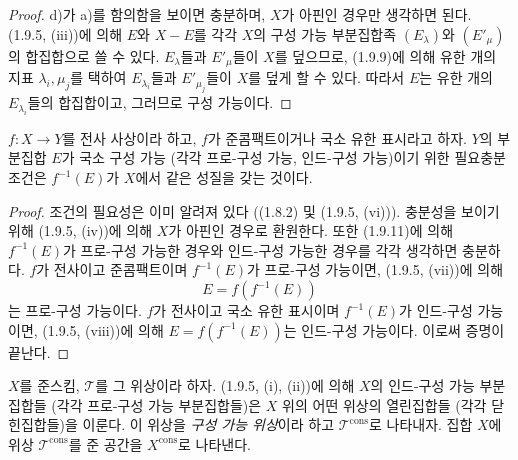 \begin{proof}
d)가 a)를 함의함을 보이면 충분하며, $X$가 아핀인 경우만 생각하면
된다. (1.9.5, (iii))에 의해 $E$와 $X-E$를 각각 $X$의 구성 가능
부분집합족 $(E_\lambda)$와 $(E'_\mu)$의 합집합으로 쓸 수 있다.
$E_\lambda$들과 $E'_\mu$들이 $X$를 덮으므로, (1.9.9)에 의해 유한
개의 지표 $\lambda_i,\mu_j$를 택하여 $E_{\lambda_i}$들과
$E'_{\mu_j}$들이 $X$를 덮게 할 수 있다. 따라서 $E$는 유한 개의
$E_{\lambda_i}$들의 합집합이고, 그러므로 구성 가능이다.
\end{proof}

\begin{corollary}[1.9.12]
\label{IV.1.9.12-fr}
$f:X\to Y$를 전사 사상이라 하고, $f$가 준콤팩트이거나 국소 유한
표시라고 하자. $Y$의 부분집합 $E$가 국소 구성 가능 (각각 프로-구성
가능, 인드-구성 가능)이기 위한 필요충분조건은 $f^{-1}(E)$가 $X$에서
같은 성질을 갖는 것이다.
\end{corollary}


\begin{proof}
조건의 필요성은 이미 알려져 있다 ((1.8.2) 및 (1.9.5, (vi))). 충분성을
보이기 위해 (1.9.5, (iv))에 의해 $X$가 아핀인 경우로 환원한다. 또한
(1.9.11)에 의해 $f^{-1}(E)$가 프로-구성 가능한 경우와 인드-구성 가능한
경우를 각각 생각하면 충분하다. $f$가 전사이고 준콤팩트이며
$f^{-1}(E)$가 프로-구성 가능이면, (1.9.5, (vii))에 의해
\[
  E=f(f^{-1}(E))
\]
는 프로-구성 가능이다. $f$가 전사이고 국소 유한 표시이며
$f^{-1}(E)$가 인드-구성 가능이면, (1.9.5, (viii))에 의해
$E=f(f^{-1}(E))$는 인드-구성 가능이다. 이로써 증명이 끝난다.
\end{proof}

\begin{env}[1.9.13]
\label{IV.1.9.13-fr}
$X$를 준스킴, $\mathscr T$를 그 위상이라 하자. (1.9.5, (i), (ii))에
의해 $X$의 인드-구성 가능 부분집합들 (각각 프로-구성 가능 부분집합들)은
$X$ 위의 어떤 위상의 열린집합들 (각각 닫힌집합들)을 이룬다. 이 위상을
\emph{구성 가능 위상}이라 하고 $\mathscr T^{\mathrm{cons}}$로 나타내자.
집합 $X$에 위상 $\mathscr T^{\mathrm{cons}}$를 준 공간을
$X^{\mathrm{cons}}$로 나타낸다.
\end{env}

